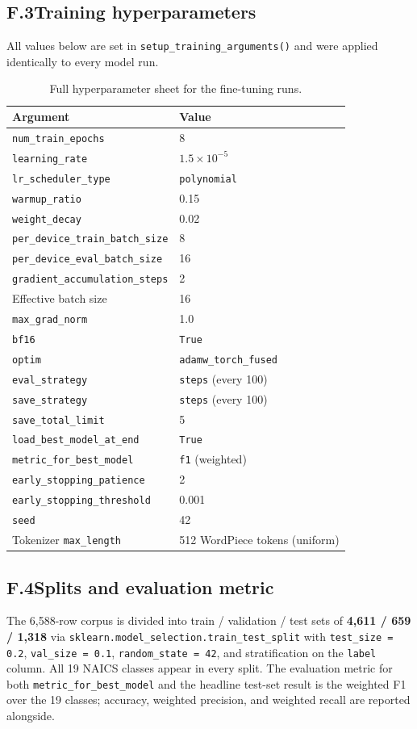 \subsection*{F.3\quad Training hyperparameters}
All values below are set in \texttt{setup\_training\_arguments()} and were applied identically to every model run.
\begin{table}[ht]
\centering
\caption{Full hyperparameter sheet for the fine-tuning runs.}
\label{tab:training-hp}
\small
\begin{tabular}{ll}
\toprule
Argument & Value \\
\midrule
\texttt{num\_train\_epochs} & 8 \\
\texttt{learning\_rate} & $1.5\times 10^{-5}$ \\
\texttt{lr\_scheduler\_type} & \texttt{polynomial} \\
\texttt{warmup\_ratio} & 0.15 \\
\texttt{weight\_decay} & 0.02 \\
\texttt{per\_device\_train\_batch\_size} & 8 \\
\texttt{per\_device\_eval\_batch\_size} & 16 \\
\texttt{gradient\_accumulation\_steps} & 2 \\
Effective batch size & 16 \\
\texttt{max\_grad\_norm} & 1.0 \\
\texttt{bf16} & \texttt{True} \\
\texttt{optim} & \texttt{adamw\_torch\_fused} \\
\texttt{eval\_strategy} & \texttt{steps} (every 100) \\
\texttt{save\_strategy} & \texttt{steps} (every 100) \\
\texttt{save\_total\_limit} & 5 \\
\texttt{load\_best\_model\_at\_end} & \texttt{True} \\
\texttt{metric\_for\_best\_model} & \texttt{f1} (weighted) \\
\texttt{early\_stopping\_patience} & 2 \\
\texttt{early\_stopping\_threshold} & 0.001 \\
\texttt{seed} & 42 \\
Tokenizer \texttt{max\_length} & 512 WordPiece tokens (uniform) \\
\bottomrule
\end{tabular}
\end{table}

\subsection*{F.4\quad Splits and evaluation metric}
The 6{,}588-row corpus is divided into train / validation / test sets of \textbf{4{,}611 / 659 / 1{,}318} via \texttt{sklearn.model\_selection.train\_test\_split} with \texttt{test\_size = 0.2}, \texttt{val\_size = 0.1}, \texttt{random\_state = 42}, and stratification on the \texttt{label} column. All 19 NAICS classes appear in every split. The evaluation metric for both \texttt{metric\_for\_best\_model} and the headline test-set result is the weighted F1 over the 19 classes; accuracy, weighted precision, and weighted recall are reported alongside.

